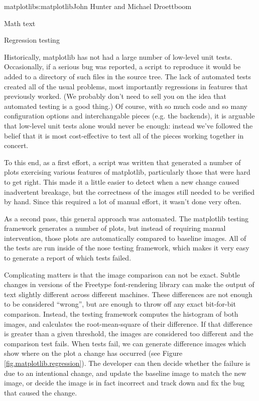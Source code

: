 \begin{aosachapter}{matplotlib}{s:matplotlib}{John Hunter and Michael Droettboom}
\begin{aosasect1}{Math text}
\end{aosasect1}

\begin{aosasect1}{Regression testing}

  Historically, matplotlib has not had a large number of low-level
  unit tests.  Occasionally, if a serious bug was reported, a script
  to reproduce it would be added to a directory of such files in the
  source tree.  The lack of automated tests created all of the usual
  problems, most importantly regressions in features that previously
  worked.  (We probably don't need to sell you on the idea that
  automated testing is a good thing.)  Of course, with so much code
  and so many configuration options and interchangable pieces
  (e.g. the backends), it is arguable that low-level unit tests alone
  would never be enough: instead we've followed the belief that it is
  most cost-effective to test all of the pieces working together in
  concert.

To this end, as a first effort, a script was written that generated a
number of plots exercising various features of matplotlib,
particularly those that were hard to get right.  This made it a little
easier to detect when a new change caused inadvertent breakage, but
the correctness of the images still needed to be verified by hand.
Since this required a lot of manual effort, it wasn't done very often.

As a second pass, this general approach was automated.  The matplotlib
testing framework generates a number of plots, but instead of
requiring manual intervention, those plots are automatically compared
to baseline images.  All of the tests are run inside of the nose
testing framework, which makes it very easy to generate a report of
which tests failed.

Complicating matters is that the image comparison can not be exact.
Subtle changes in versions of the Freetype font-rendering library can
make the output of text slightly different across different machines.
These differences are not enough to be considered ``wrong'', but are
enough to throw off any exact bit-for-bit comparison.  Instead, the
testing framework computes the histogram of both images, and
calculates the root-mean-square of their difference.  If that
difference is greater than a given threshold, the images are
considered too different and the comparison test fails.  When tests
fail, we can generate difference images which show where on the plot a
change has occurred (see Figure \ref{fig.matplotlib.regression}).  The
developer can then decide whether the failure is due to an intentional
change, and update the baseline image to match the new image, or
decide the image is in fact incorrect and track down and fix the bug
that caused the change.


\end{aosasect1}
\end{aosachapter}
